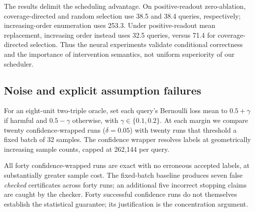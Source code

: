 \documentclass[10pt]{article}
\theoremstyle{definition}\newtheorem{definition}[theorem]{Definition}
\begin{document}
\begin{table}[t]
\centering\small\setlength{\tabcolsep}{4pt}
\caption{Means across ten seeds per model/policy condition. ``Max. rank'' is the
range of each model's largest minimal failure-set size. Last four columns count
queries to a certificate. All methods are exact on these forty conditions.}
\label{tab:neural}
\end{table}

The results delimit the scheduling advantage. On positive-readout zero-ablation,
coverage-directed and random selection use 38.5 and 38.4 queries, respectively;
increasing-order enumeration uses 253.3. Under positive-readout mean replacement,
increasing order instead uses 32.5 queries, versus 71.4 for coverage-directed
selection. Thus the neural experiments validate conditional correctness and the
importance of intervention semantics, not uniform superiority of our scheduler.

\subsection{Noise and explicit assumption failures}
For an eight-unit two-triple oracle, set each query's Bernoulli loss mean to
$0.5+\gamma$ if harmful and $0.5-\gamma$ otherwise, with $\gamma\in\{0.1,0.2\}$.
At each margin we compare twenty confidence-wrapped runs ($\delta=0.05$) with twenty
runs that threshold a fixed batch of 32 samples. The confidence wrapper resolves
labels at geometrically increasing sample counts, capped at 262,144 per query.

\begin{table}[t]
\centering\small\setlength{\tabcolsep}{4pt}
\caption{Noisy auditing. ``Checked cert.'' passes the independent transcript checker;
``False cert.'' passes that checker but identifies the wrong true oracle. The checked
false count excludes contradictions already caught by the checker. Mask and sample
columns are means; success columns count twenty runs.}
\label{tab:noise}
\end{table}

All forty confidence-wrapped runs are exact with no erroneous accepted labels, at
substantially greater sample cost. The fixed-batch baseline produces seven false
\emph{checked} certificates across forty runs; an additional five incorrect stopping
claims are caught by the checker. Forty successful confidence runs do not themselves
establish the statistical guarantee; its justification is the concentration argument.
\end{document}
